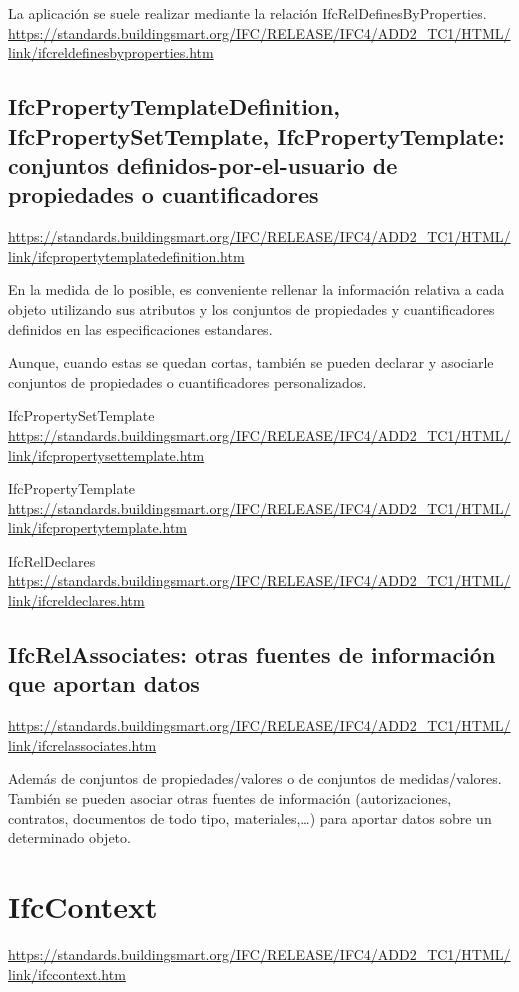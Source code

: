 \documentclass[spanish,12pt,a4paper,final,oneside]{book}
\begin{document}
La aplicación se suele realizar mediante la relación IfcRelDefinesByProperties.
\\ \url{https://standards.buildingsmart.org/IFC/RELEASE/IFC4/ADD2_TC1/HTML/link/ifcreldefinesbyproperties.htm}


\subsection{IfcPropertyTemplateDefinition, IfcPropertySetTemplate, IfcPropertyTemplate: conjuntos definidos-por-el-usuario de propiedades o cuantificadores}
\url{https://standards.buildingsmart.org/IFC/RELEASE/IFC4/ADD2_TC1/HTML/link/ifcpropertytemplatedefinition.htm}

En la medida de lo posible, es conveniente rellenar la información relativa a cada objeto utilizando sus atributos y los conjuntos de propiedades y cuantificadores definidos en las especificaciones estandares.

Aunque, cuando estas se quedan cortas, también se pueden declarar y asociarle conjuntos de propiedades o cuantificadores personalizados. 

IfcPropertySetTemplate
\\ \url{https://standards.buildingsmart.org/IFC/RELEASE/IFC4/ADD2_TC1/HTML/link/ifcpropertysettemplate.htm}

IfcPropertyTemplate
\\ \url{https://standards.buildingsmart.org/IFC/RELEASE/IFC4/ADD2_TC1/HTML/link/ifcpropertytemplate.htm}

IfcRelDeclares
\\ \url{https://standards.buildingsmart.org/IFC/RELEASE/IFC4/ADD2_TC1/HTML/link/ifcreldeclares.htm}


\subsection{IfcRelAssociates: otras fuentes de información que aportan datos}
\url{https://standards.buildingsmart.org/IFC/RELEASE/IFC4/ADD2_TC1/HTML/link/ifcrelassociates.htm}

Además de conjuntos de propiedades/valores o de conjuntos de medidas/valores. También se pueden asociar otras fuentes de información (autorizaciones, contratos, documentos de todo tipo, materiales,\ldots) para aportar datos sobre un determinado objeto.



\section{IfcContext}
\url{https://standards.buildingsmart.org/IFC/RELEASE/IFC4/ADD2_TC1/HTML/link/ifccontext.htm}
\end{document}
